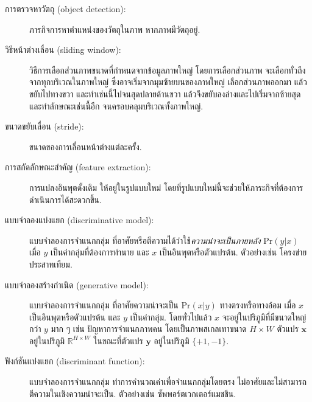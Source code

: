 \begin{description}
	
	\item[การตรวจหาวัตถุ (object detection):] 
	ภารกิจการหาตำแหน่งของวัตถุในภาพ หากภาพมีวัตถุอยู่.

	\item[วิธีหน้าต่างเลื่อน (sliding window):] 
วิธีการเลือกส่วนภาพขนาดที่กำหนดจากข้อมูลภาพใหญ่
โดยการเลือกส่วนภาพ จะเลือกทั่วถึงจากทุกบริเวณในภาพใหญ่
ซึ่งอาจเริ่มจากมุมซ้ายบนของภาพใหญ่
เลือกส่วนภาพออกมา แล้วขยับไปทางขวา และทำเช่นนี้ไปจนสุดปลายด้านขวา
แล้วจึงขยับลงล่างและไปเริ่มจากซ้ายสุด 
และทำลักษณะเช่นนี้อีก จนครอบคลุมบริเวณทั้งภาพใหญ่.

	\item[ขนาดขยับเลื่อน (stride):] 
ขนาดของการเลื่อนหน้าต่างแต่ละครั้ง.
			
	\item[การสกัดลักษณะสำคัญ (feature extraction):] 
การแปลงอินพุตดั้งเดิม ให้อยู่ในรูปแบบใหม่ โดยที่รูปแบบใหม่นี้จะช่วยให้ภาระกิจที่ต้องการดำเนินการได้สะดวกขึ้น.

	\item[แบบจำลองแบ่งแยก (discriminative model):] 
แบบจำลองการจำแนกกลุ่ม ที่อาศัยหรือตีความได้ว่าใช้\textit{ความน่าจะเป็นภายหลัง} $\mathrm{Pr}(y|x)$ เมื่อ $y$ เป็นค่ากลุ่มที่ต้องการทำนาย และ $x$ เป็นอินพุตหรือตัวแปรต้น.
ตัวอย่างเช่น โครงข่ายประสาทเทียม.

	\item[แบบจำลองสร้างกำเนิด (generative model):] 
แบบจำลองการจำแนกกลุ่ม 
ที่อาศัยความน่าจะเป็น $\mathrm{Pr}(x|y)$ ทางตรงหรือทางอ้อม 
เมื่อ $x$ เป็นอินพุตหรือตัวแปรต้น และ $y$ เป็นค่ากลุ่ม.
โดยทั่วไปแล้ว $x$ จะอยู่ในปริภูมิที่มีขนาดใหญ่กว่า $y$ มาก ๆ
เช่น ปัญหาการจำแนกภาพคน โดยเป็นภาพสเกลเทาขนาด $H \times W$
ตัวแปร $\bm{x}$ อยู่ในปริภูมิ $\mathbb{R}^{H \times W}$ 
ในขณะที่ตัวแปร $\bm{y}$ อยู่ในปริภูมิ $\{+1, -1\}$.

\item[ฟังก์ชันแบ่งแยก (discriminant function):] 
แบบจำลองการจำแนกกลุ่ม ทำการคำนวณค่าเพื่อจำแนกกลุ่มโดยตรง 
ไม่อาศัยและไม่สามารถตีความในเชิงความน่าจะเป็น.
ตัวอย่างเช่น ซัพพอร์ตเวกเตอร์แมชชีน.


\end{description}
